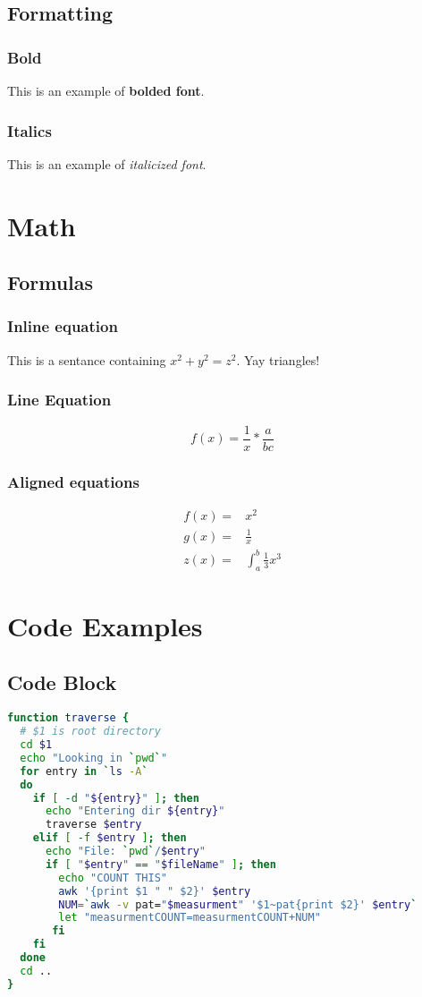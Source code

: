 \documentclass{article}
\begin{document}
	\subsection{Formatting}
		\subsubsection{Bold}
		This is an example of \textbf{bolded font}.
		\subsubsection{Italics}
		This is an example of \textit{italicized font}.

\section{Math}
	\subsection{Formulas}
		\subsubsection{Inline equation}
		This is a sentance containing $x^2 + y^2 = z^2$. Yay triangles!
		\subsubsection{Line Equation}
		\begin{equation}
			f(x) = \frac{1}{x} * \frac{a}{bc}
		\end{equation}
		\subsubsection{Aligned equations}
			\begin{align}
				f(x) =& x^2 \\
				g(x) =& \frac{1}{x} \\
				z(x) =& \int_{a}^{b} \frac{1}{3} x^3 
			\end{align}

\newpage

\section{Code Examples}
	\subsection{Code Block}
\begin{lstlisting}[language=bash,upquote=true]
function traverse {
  # $1 is root directory
  cd $1
  echo "Looking in `pwd`"
  for entry in `ls -A` 
  do
    if [ -d "${entry}" ]; then
      echo "Entering dir ${entry}"
      traverse $entry
    elif [ -f $entry ]; then
      echo "File: `pwd`/$entry"
      if [ "$entry" == "$fileName" ]; then
        echo "COUNT THIS"
        awk '{print $1 " " $2}' $entry
        NUM=`awk -v pat="$measurment" '$1~pat{print $2}' $entry`
        let "measurmentCOUNT=measurmentCOUNT+NUM"
       fi    
    fi
  done
  cd ..
}
		\end{lstlisting}
\end{document}

